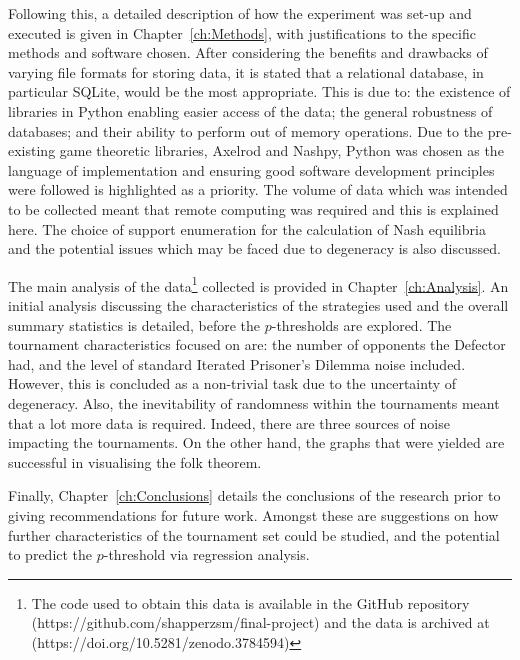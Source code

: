 Following this, a detailed description of how the experiment was set-up and
executed is given in Chapter~\ref{ch:Methods}, with justifications to the specific methods and software
chosen. After considering the benefits and drawbacks of varying file formats for
storing data, it is stated that a relational database, in particular SQLite,
would be the most appropriate. This is due to: the existence of libraries in
Python enabling easier access of the data; the general robustness of
databases; and their ability to perform out of memory operations. Due to the
pre-existing game theoretic libraries, Axelrod and Nashpy, Python was chosen as
the language of implementation and ensuring good software development principles
were followed is highlighted as a priority. The volume of data which was intended
to be collected meant that remote computing was required and this is explained here. The choice of support enumeration for the calculation of
Nash equilibria and the potential issues which may be faced due to degeneracy is
also discussed.

The main analysis of the data\footnote{The code used to obtain this data is
available in the GitHub repository (https://github.com/shapperzsm/final-project) and the data is archived at (https://doi.org/10.5281/zenodo.3784594)} collected is provided in Chapter~\ref{ch:Analysis}. An initial
analysis discussing the characteristics of
the strategies used and the overall summary statistics is detailed, before the
\(p\)-thresholds are explored. The tournament characteristics focused on
are: the number of opponents the Defector had, and the level of standard
Iterated Prisoner's Dilemma noise
included. However, this is concluded as a non-trivial task due to the
uncertainty of degeneracy.
Also, the inevitability of randomness within the tournaments meant that a lot
more data is required. Indeed, there are three sources of
noise impacting the tournaments. On the other hand, the graphs that
were yielded are successful in visualising the folk theorem.

Finally, Chapter~\ref{ch:Conclusions} details the
conclusions of the research prior to giving recommendations for future work.
Amongst these are suggestions on how further characteristics of the tournament
set could be studied, and the potential to predict the \(p\)-threshold via regression analysis.